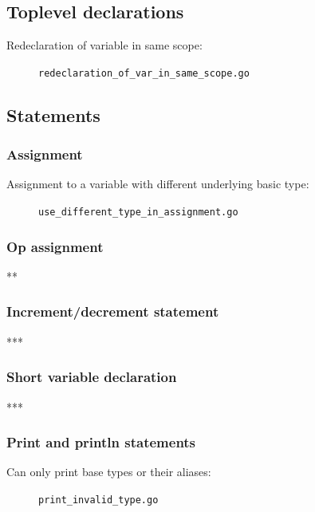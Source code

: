 \documentclass[oneside]{article}
\begin{document}
\subsection{Toplevel declarations}

\begin{description}
  \item[Redeclaration of variable in same scope:] \verb|redeclaration_of_var_in_same_scope.go|
\end{description}

\subsection{Statements}

\subsubsection{Assignment}
\begin{description}
  \item[Assignment to a variable with different underlying basic type:] \verb|use_different_type_in_assignment.go|
\end{description}

\subsubsection{Op assignment}
\begin{description}
  \item ***
\end{description}

\subsubsection{Increment/decrement statement}
***

\subsubsection{Short variable declaration}
***

\subsubsection{Print and println statements}
\begin{description}
  \item[Can only print base types or their aliases:] \verb|print_invalid_type.go|
\end{description}
\end{document}
